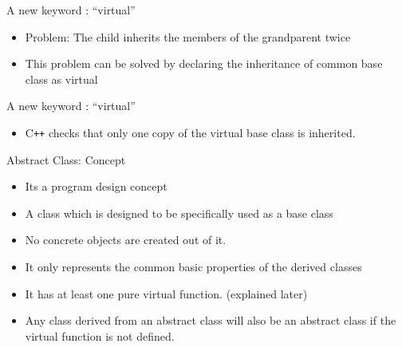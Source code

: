 \documentclass{beamer}
\begin{document}
\begin{frame}[fragile]{A new keyword : ``virtual''}
  \begin{itemize}
  \item Problem: The child inherits the members of the grandparent twice\pause
  \item This problem can be solved by declaring the inheritance of common base class as virtual
  \end{itemize}
\end{frame}

\begin{frame}[fragile]{A new keyword : ``virtual''}
  \begin{itemize}
  \begin{lstlisting}
class grandParent {
  ...
};
class Parent1 : virtual public grandParent {
  ...
};
class Parent2 : virtual public grandParent {
  ...
};
class child : public Parent1, public Parent2 {
  ...
};
  \end{lstlisting}\pause
  \item C\texttt{++} checks that only one copy of the virtual base class is inherited.
  \end{itemize}
\end{frame}

\begin{frame}[fragile]{Abstract Class: Concept}
  \begin{itemize}
  \item Its a program design concept\pause
  \item A class which is designed to be specifically used as a base class\pause
  \item No concrete objects are created out of it.\pause
  \item It only represents the common basic properties of the derived classes\pause
  \item It has at least one pure virtual function. (explained later)\pause
  \item Any class derived from an abstract class will also be an abstract class if the virtual function is not defined.
  \end{itemize}
\end{frame}
\end{document}
